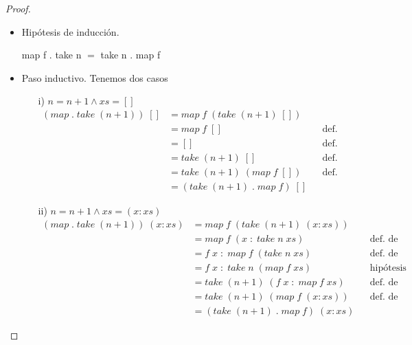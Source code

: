 \documentclass[letterpaper,11pt]{article}
\begin{document}
\begin{enumerate}
\begin{itemize}
\begin{proof}
\begin{itemize}
                \item Hipótesis de inducción.
                \begin{center}
                    map f . take n $=$ take n . map f
                \end{center}

                \item Paso inductivo. Tenemos dos casos
                \begin{itemize}
                    \item[i)] $n = n+1 \land xs = []$
                    \begin{align*}
                        (map \; . \; take \; (n+1)) \; []
                        &= map \; f \; (take \; (n+1) \; []) \\
                        &= map \; f \; []
                        && \text{def. de take} \\ 
                        &= []
                        && \text{def. de map} \\ 
                        &= take \; (n+1) \; []
                        && \text{def. de take} \\ 
                        &= take \; (n+1) \; (map \; f \; [])
                        && \text{def. de map} \\ 
                        &= (take \; (n+1) \; . \; map \; f) \; []
                    \end{align*}

                    \item[ii)] $n = n + 1 \land xs = (x:xs)$ 
                    \begin{align*}
                        (map \; . \; take \; (n+1)) \; (x:xs) 
                        &= map \; f \; (take \; (n+1) \; (x:xs)) \\
                        &= map \; f \; (x \; : \; take \; n \; xs)
                        && \text{def. de take} \\ 
                        &= f \; x \; : \; map \; f \; (take \; n \; xs)
                        && \text{def. de map} \\ 
                        &= f \; x \; : \; take \; n \; (map \; f \; xs)
                        && \text{hipótesis de inducción} \\ 
                        &= take \; (n+1) \; (f \; x \; : \; map \; f \; xs)
                        && \text{def. de take} \\ 
                        &= take \; (n+1) \; (map \; f \; (x:xs))
                        && \text{def. de map} \\ 
                        &= (take \; (n+1) \; . \; map \; f) \; (x:xs)
                    \end{align*}
                \end{itemize}
            \end{itemize}
        \end{proof}


\end{itemize}
\end{enumerate}
\end{document}
